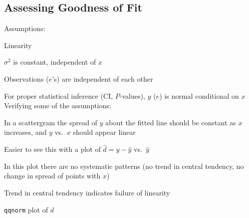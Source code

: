 \subsection{Assessing Goodness of Fit}
  
Assumptions:
\be
\item   Linearity
\item   $\sigma^2$ is constant, independent of $x$
\item   Observations ($e$'s) are independent of each other
\item   For proper statistical inference (CI, $P$-values), $y$ ($e$)
        is normal conditional on $x$
\ee
Verifying some of the assumptions:
\bi
\item   In a scattergram the spread of $y$ about the fitted line
        should be constant as $x$ increases, and $y$ vs.\ $x$ should
        appear linear
\item   Easier to see this with a plot of $\hat{d} = y - \hat{y}$ vs.\
  $\hat{y}$
\item   In this plot there are no
        systematic patterns (no trend in central tendency, no change
        in spread of points with $x$)
\item Trend in central tendency indicates failure of linearity
\item   \texttt{qqnorm} plot of $d$
\ei
